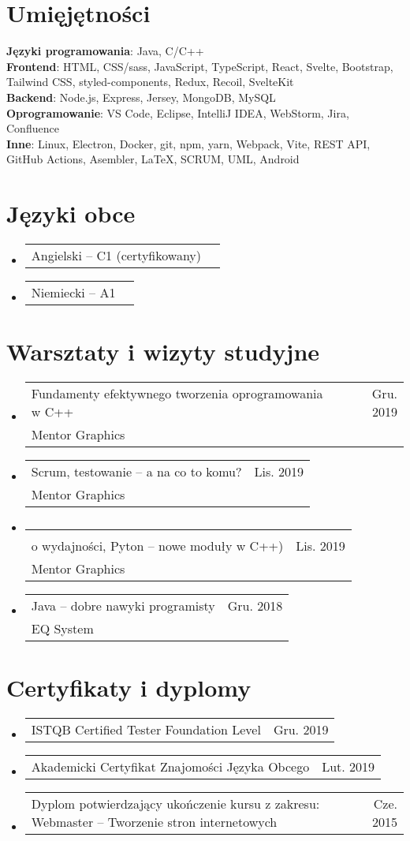 \documentclass[A4,11pt]{article}
\makeatletter
\newcommand{\Course}[3]{
  \item
    \begin{tabular*}{0.97\textwidth}[t]{l@{\extracolsep{\fill}}r}
      {\setstretch{0.6}#1} & #2 \\
      \small #3 \\
    \end{tabular*}\vspace{4pt}
}
\newcommand{\CVSubSubheading}[2]{
  \item
    \begin{tabular*}{0.97\textwidth}{l@{\extracolsep{\fill}}r}
      \small#1 & \small #2 \\
    \end{tabular*}\vspace{-4pt}
}
\newcommand{\CVSubHeadingListStart}{\begin{itemize}[leftmargin=0.5cm, label={}]}
\newcommand{\CVSubHeadingListEnd}{\end{itemize}}
\makeatother
\begin{document}
\section{Umięjętności}
  \begin{itemize}[leftmargin=0.5cm, label={}]
    \small{\item{
    \textbf{Języki programowania}{: Java, C/C++} \\
    \textbf{Frontend}{: HTML, CSS/sass, JavaScript, TypeScript, React, Svelte, Bootstrap, Tailwind CSS, styled-components,  Redux, Recoil, SvelteKit} \\
    \textbf{Backend}{: Node.js, Express, Jersey, MongoDB, MySQL} \\
    \textbf{Oprogramowanie}{: VS Code, Eclipse, IntelliJ IDEA, WebStorm, Jira, Confluence} \\
    \textbf{Inne}{: Linux, Electron, Docker, git, npm, yarn, Webpack, Vite, REST API, GitHub Actions, Asembler, \LaTeX, SCRUM, UML, Android}
    }}
  \end{itemize}

\section{Języki obce}
  \CVSubHeadingListStart
    \CVSubSubheading{Angielski -- C1 (certyfikowany)}{}
    \CVSubSubheading{Niemiecki -- A1}{}
  \CVSubHeadingListEnd

\section{Warsztaty i wizyty studyjne}
  \CVSubHeadingListStart
    \Course
      {Fundamenty efektywnego tworzenia oprogramowania w C++}{Gru. 2019}
      {Mentor Graphics}
    \Course
      {Scrum, testowanie -- a na co to komu?}{Lis. 2019}
      {Mentor Graphics}
    \Course
      {\makecell[l]{"Be quick or be dead" (Szyfrowanie stosowane, Programowanie w C++ z myślą\\o wydajności, Pyton -- nowe moduły w C++)}}{Lis. 2019}
      {Mentor Graphics}
    \Course
      {Java -- dobre nawyki programisty}{Gru. 2018}
      {EQ System}
  \CVSubHeadingListEnd

\section{Certyfikaty i dyplomy}
  \CVSubHeadingListStart
    \CVSubSubheading{ISTQB Certified Tester Foundation Level}{Gru. 2019}
    \CVSubSubheading{Akademicki Certyfikat Znajomości Języka Obcego}{Lut. 2019}
    \CVSubSubheading{Dyplom potwierdzający ukończenie kursu z zakresu: Webmaster -- Tworzenie stron internetowych}{Cze. 2015}
  \CVSubHeadingListEnd
\end{document}
